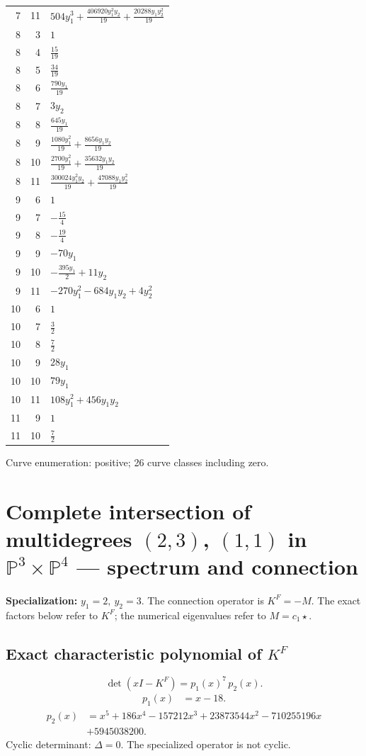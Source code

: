 \documentclass[10pt,a4paper]{article}
\begin{document}
{\begin{longtable}{rrp{125mm}}
7 & 11 & $504 y_{1}^{3} + \frac{406920 y_{1}^{2} y_{2}}{19} + \frac{20288 y_{1} y_{2}^{2}}{19}$\\
8 & 3 & $1$\\
8 & 4 & $\frac{15}{19}$\\
8 & 5 & $\frac{34}{19}$\\
8 & 6 & $\frac{790 y_{1}}{19}$\\
8 & 7 & $3 y_{2}$\\
8 & 8 & $\frac{645 y_{1}}{19}$\\
8 & 9 & $\frac{1080 y_{1}^{2}}{19} + \frac{8656 y_{1} y_{2}}{19}$\\
8 & 10 & $\frac{2700 y_{1}^{2}}{19} + \frac{35632 y_{1} y_{2}}{19}$\\
8 & 11 & $\frac{300024 y_{1}^{2} y_{2}}{19} + \frac{47088 y_{1} y_{2}^{2}}{19}$\\
9 & 6 & $1$\\
9 & 7 & $- \frac{15}{4}$\\
9 & 8 & $- \frac{19}{4}$\\
9 & 9 & $- 70 y_{1}$\\
9 & 10 & $- \frac{395 y_{1}}{2} + 11 y_{2}$\\
9 & 11 & $- 270 y_{1}^{2} - 684 y_{1} y_{2} + 4 y_{2}^{2}$\\
10 & 6 & $1$\\
10 & 7 & $\frac{3}{2}$\\
10 & 8 & $\frac{7}{2}$\\
10 & 9 & $28 y_{1}$\\
10 & 10 & $79 y_{1}$\\
10 & 11 & $108 y_{1}^{2} + 456 y_{1} y_{2}$\\
11 & 9 & $1$\\
11 & 10 & $\frac{7}{2}$\\
\end{longtable}}
Curve enumeration: positive; 26 curve classes including zero.
\clearpage\section*{Complete intersection of multidegrees $(2,3)$, $(1,1)$ in $\mathbb P^{3}\times \mathbb P^{4}$ --- spectrum and connection}
\textbf{Specialization:} $y_1=2,\ y_2=3$. The connection operator is $K^F=-M$. The exact factors below refer to $K^F$; the numerical eigenvalues refer to $M=c_1\star$.
\subsection*{Exact characteristic polynomial of $K^F$}
\[\det(xI-K^F)=p_{1}(x)^{7}\,p_{2}(x).\]
\[\begin{aligned}p_{1}(x)&=x - 18.\end{aligned}\]
\[\begin{aligned}p_{2}(x)&=x^{5} + 186 x^{4} - 157212 x^{3} + 23873544 x^{2} - 710255196 x\\&+5945038200.\end{aligned}\]
Cyclic determinant: $\Delta=0$. The specialized operator is not cyclic.
\end{document}
